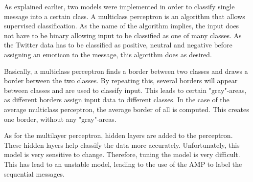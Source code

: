 As explained earlier, two models were implemented in order to classify single message into a certain class.
A multiclass perceptron is an algorithm that allows supervised classification.
As the name of the algorithm implies, the input does not have to be binary allowing input to be classified as one of many classes.
As the Twitter data has to be classified as positive, neutral and negative before assigning an emoticon to the message, this algorithm does as desired. 

Basically, a multiclass perceptron finds a border between two classes and draws a border between the two classes. By repeating this, several borders will appear between classes and are used to classify input. This leads to certain "gray"-areas, as different borders assign input data to different classes. In the case of the average multiclass perceptron, the average border of all is computed. This creates one border, without any "gray"-areas.

As for the multilayer perceptron, hidden layers are added to the perceptron. These hidden layers help classify the data more accurately. Unfortunately, this model is very sensitive to change. Therefore, tuning the model is very difficult. This has lead to an unstable model, leading to the use of the AMP to label the sequential messages.
